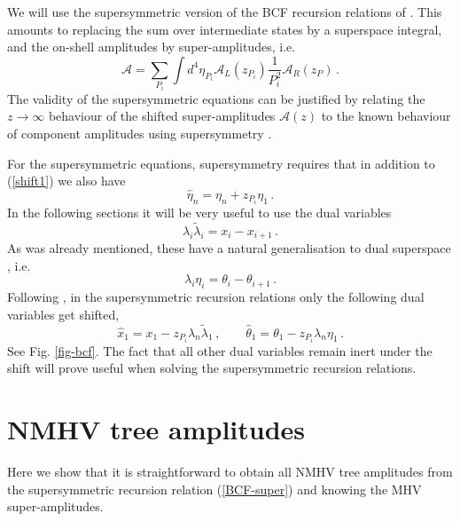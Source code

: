 \documentclass[12pt]{article}
\def \be  {\begin{equation}}
\def \ee  {\end{equation}}
\begin{document}
We will use the supersymmetric version of the BCF recursion relations of \cite{arkani,Brandhuber:2008pf,ArkaniHamed:2008gz}.
This amounts to replacing the sum over intermediate states by a superspace
integral, and the on-shell amplitudes by super-amplitudes, i.e.
\be \label{BCF-super} \mathcal{A} = \sum_{P_{i}} \int
d^{4}\eta_{P_{i}} \mathcal{A}_{L}(z_{P_{i}}) \frac{1}{P_{i}^2}
\mathcal{A}_{R}(z_{P})\,. \ee The validity of the supersymmetric
equations can be justified by relating the $z \to \infty$
behaviour of the shifted super-amplitudes $\mathcal{A}(z)$ to the
known behaviour of component amplitudes \cite{Britto:2005fq}
using supersymmetry \cite{arkani,Brandhuber:2008pf,ArkaniHamed:2008gz}.

For the supersymmetric equations, supersymmetry requires that in
addition to (\ref{shift1}) we also have \be \label{shift2}
\hat{\eta}_{n} = \eta_{n} + z_{P_{i}} \eta_{1} \,. \ee
In the following sections it will be very useful to use the dual variables \cite{Drummond:2006rz}
\be \label{dualx}
\lambda_{i}\tilde\lambda_{i}   = x_{i} - x_{i+1}\,.
\ee
As was already mentioned, these have a natural generalisation to dual superspace \cite{dhks5}, i.e.
\be \label{dualth}
\lambda_{i} \eta_{i}  = \theta_{i} - \theta_{i+1}\,.
\ee
Following \cite{Brandhuber:2008pf}, in the supersymmetric recursion relations only the following dual
variables get shifted,
\be
\hat{x}_{1} = x_{1} - z_{P_{i}} \lambda_{n} \tilde{\lambda}_{1}\,,\qquad \hat{\theta}_{1} = \theta_{1} - z_{P_{i}} \lambda_{n} \eta_{1}\,.
\ee
See Fig. \ref{fig-bcf}.
The fact that all other dual variables remain inert under the shift will prove useful when solving the supersymmetric recursion relations.

\section{NMHV tree amplitudes}\label{sect-NMHV}

Here we show that it is straightforward to obtain all NMHV tree amplitudes from the supersymmetric recursion relation (\ref{BCF-super}) and knowing the MHV super-amplitudes.
\end{document}
